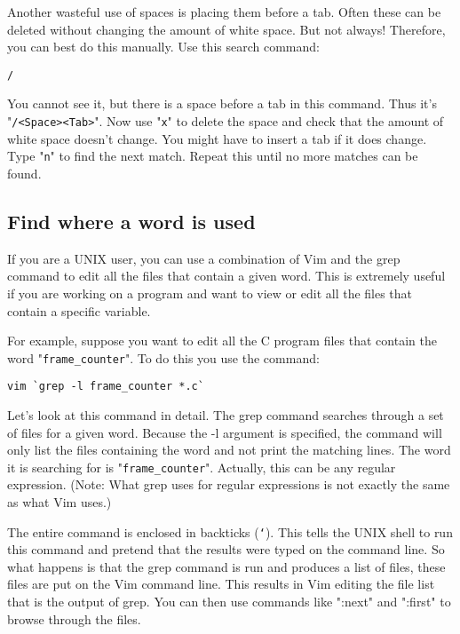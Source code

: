 {Another wasteful use of spaces is placing them before a tab.
Often these can be deleted without changing the amount of white space.
But not always!  Therefore, you can best do this manually.
Use this search command:

\begin{Verbatim}[samepage=true]
 /   
\end{Verbatim}

You cannot see it, but there is a space before a tab in this command.
Thus it's "\texttt{/<Space><Tab>}".
Now use "\texttt{x}" to delete the space and check that the amount of white space doesn't change.
You might have to insert a tab if it does change.
Type "\texttt{n}" to find the next match.
Repeat this until no more matches can be found.
\subsection{Find where a word is used}
If you are a UNIX user, you can use a combination of Vim and the grep command to edit all the files that contain a given word.
This is extremely useful if you are working on a program and want to view or edit all the files that contain a specific variable.

For example, suppose you want to edit all the C program files that contain the word "\texttt{frame_counter}".
To do this you use the command:

\begin{Verbatim}[samepage=true]
 vim `grep -l frame_counter *.c`
\end{Verbatim}

Let's look at this command in detail.
The grep command searches through a set of files for a given word.
Because the -l argument is specified, the command will only list the files containing the word and not print the matching lines.
The word it is searching for is "\texttt{frame_counter}".
Actually, this can be any regular expression.
(Note: What grep uses for regular expressions is not exactly the same as what Vim uses.)

The entire command is enclosed in backticks (\texttt{`}).
This tells the UNIX shell to run this command and pretend that the results were typed on the command line.
So what happens is that the grep command is run and produces a list of files, these files are put on the Vim command line.
This results in Vim editing the file list that is the output of grep.
You can then use commands like ":next" and ":first" to browse through the files.

}
